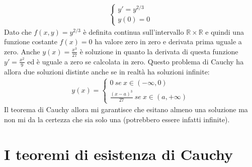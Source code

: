 \documentclass[a4paper, oneside]{book}
\begin{document}
\begin{example}
    \begin{gather*}
        \left\{\begin{array}{l}
            y' = y^{2/3}  \\
            y(0) = 0
        \end{array}\right.
    \end{gather*}
    Dato che $f(x, y) = y^{2/3}$ è definita continua sull'intervallo $\mathbb{R} \times \mathbb{R}$ e quindi
    una funzione costante  $f(x) = 0$ ha valore zero in zero e derivata prima uguale a zero. Anche $y(x) = \frac{x^{3} }{27}$ è soluzione
    in quanto la derivata di questa funzione $y' = \frac{x^{2} }{9}$ ed è uguale a zero se calcolata in zero.  Questo problema di Cauchy
    ha allora due soluzioni distinte anche se in realtà ha soluzioni infinite:
    \begin{gather*}
        y(x) = \left\{\begin{array}{l}
            0 \ se \ x \in (-\infty , 0) \\
            \frac{(x - a)^{3} }{27} \ se \ x \in (a, +\infty)
        \end{array}\right.
    \end{gather*}
    Il teorema di Cauchy allora mi garantisce che esitano almeno una soluzione ma 
    non mi da la certezza che sia solo una (potrebbero essere infatti infinite).
\end{example}


\section{I teoremi di esistenza di Cauchy}
\end{document}
